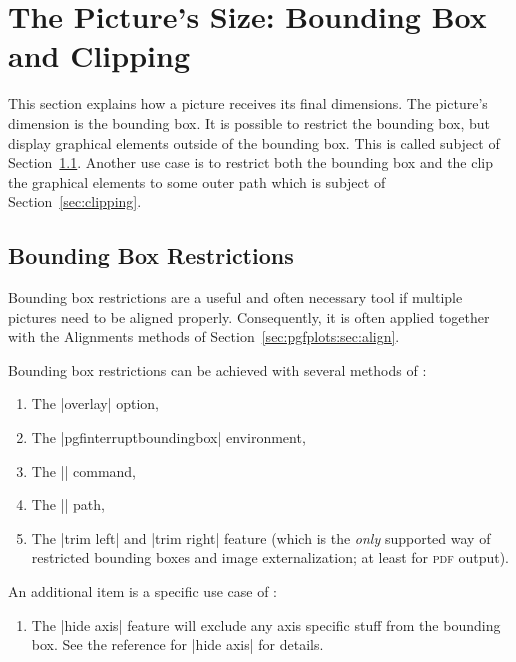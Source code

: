 
\section[reference.bb-clip]{The Picture's Size: Bounding Box and Clipping}

This section explains how a picture receives its final dimensions. The
picture's dimension is the bounding box. It is possible to restrict the
bounding box, but display graphical elements outside of the bounding box. This
is called subject of Section~\ref{sec:bb}. Another use case is to restrict both
the bounding box and the clip the graphical elements to some outer path which
is subject of Section~\ref{sec:clipping}.


\subsection{Bounding Box Restrictions}
\label{sec:bb}

Bounding box restrictions are a useful and often necessary tool if multiple
pictures need to be aligned properly. Consequently, it is often applied
together with the Alignments methods of Section~\ref{sec:pgfplots:sec:align}.

Bounding box restrictions can be achieved with several methods of \PGF{}:
%
\begin{enumerate}
    \item\label{en:overlay} The |overlay| option,
    \item The |pgfinterruptboundingbox| environment,
    \item The |\pgfresetboundingbox| command,
    \item\label{en:useasbb} The |\useasboundingbox| path,
    \item The |trim left| and |trim right| feature (which is the \emph{only}
        supported way of restricted bounding boxes and image externalization;
        at least for \textsc{pdf} output).
            \xdef\letzterwert{\the\value{enumi}}
\end{enumerate}
%
An additional item is a specific use case of \PGFPlots{}:
%
\begin{enumerate}
        \setcounter{enumi}{\letzterwert}
    \item The |hide axis| feature will exclude any axis specific stuff from
        the bounding box. See the reference for |hide axis| for
        details.
\end{enumerate}

